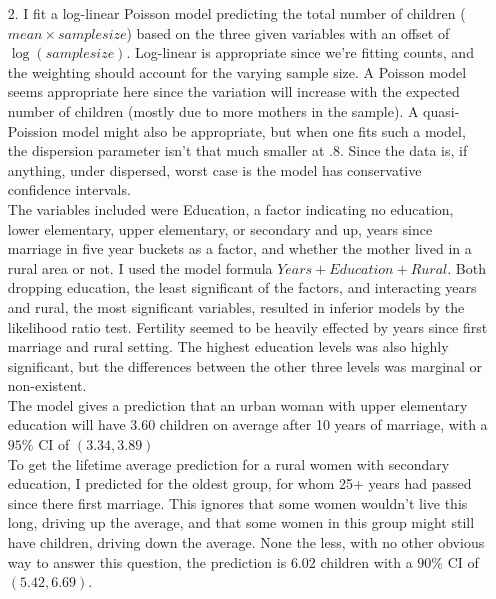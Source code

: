 \documentclass[11pt]{article}
\theoremstyle{definition}
\begin{document}
\begin{itemize}
\begin{itemize}
        \end{itemize}
    \item[2.]
        I fit a log-linear Poisson model predicting the total number of children ($mean \times sample size$) based on the three given variables with an offset of $\log(sample size)$. Log-linear is appropriate since we're fitting counts, and the weighting should account for the varying sample size. A Poisson model seems appropriate here since the variation will increase with the expected number of children (mostly due to more mothers in the sample). A quasi-Poission model might also be appropriate, but when one fits such a model, the dispersion parameter isn't that much smaller at $.8$. Since the data is, if anything, under dispersed, worst case is the model has conservative confidence intervals. \vspace{2mm} \\
        The variables included were Education, a factor indicating no education, lower elementary, upper elementary, or secondary and up, years since marriage in five year buckets as a factor, and whether the mother lived in a rural area or not. I used the model formula $Years + Education + Rural$. Both dropping education, the least significant of the factors, and interacting years and rural, the most significant variables, resulted in inferior models by the likelihood ratio test. Fertility seemed to be heavily effected by years since first marriage and rural setting. The highest education levels was also highly significant, but the differences between the other three levels was marginal or non-existent. \vspace{2mm}\\
        The model gives a prediction that an urban woman with upper elementary education will have 3.60 children on average after 10 years of marriage, with a $95\%$ CI of \((3.34,3.89)\) \vspace{2mm} \\
        To get the lifetime average prediction for a rural women with secondary education, I predicted for the oldest group, for whom 25+ years had passed since there first marriage. This ignores that some women wouldn't live this long, driving up the average, and that some women in this group might still have children, driving down the average. None the less, with no other obvious way to answer this question, the prediction is 6.02 children with a $90\%$ CI of \((5.42,6.69)\).

\end{itemize}
\end{document}
